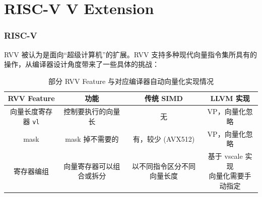 \documentclass[aspectratio=169]{ctexbeamer}
\begin{document}
\section{RISC-V V Extension}

\begin{frame}
    \frametitle{RISC-V}

    RVV 被认为是面向``超级计算机''的扩展。RVV 支持多种现代向量指令集所具有的操作，从编译器设计角度带来了一些具体的挑战：

    \begin{table}
        \scriptsize
        \centering
        \caption{部分 RVV Feature 与对应编译器自动向量化实现情况}
        \begin{tabular}{cccc}
            \toprule
            RVV Feature         & 功能           & 传统 SIMD       & LLVM 实现             \\
            \midrule
            向量长度寄存器 \texttt{vl} & 控制要执行的向量长    & 无             & VP，向量化忽略            \\
            mask                & mask 掉不需要的   & 有，较少 (AVX512) & VP，向量化忽略            \\
            寄存器编组               & 向量寄存器可以组合或拆分 & 以不同指令区分不同向量长度 & \thead{基于 vscale 实现 \\ 向量化需要手动指定} \\
            \bottomrule
        \end{tabular}
    \end{table}

\end{frame}
\end{document}
